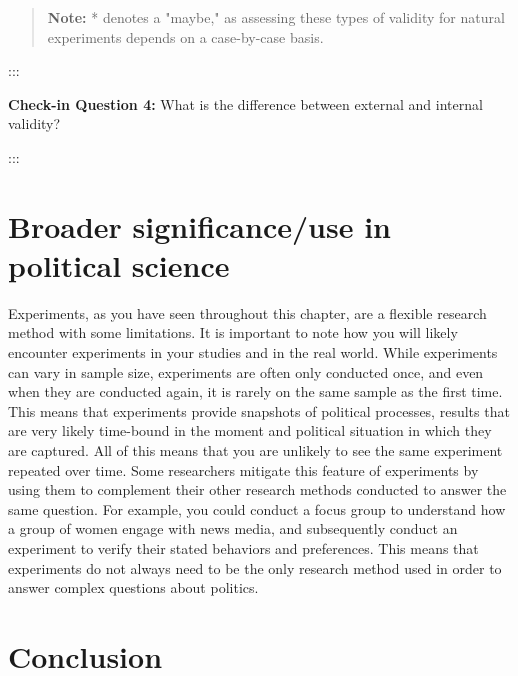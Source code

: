 \documentclass{book}
\begin{document}
\begin{quote}
\textbf{Note:} * denotes a "maybe," as assessing these types of validity for
natural experiments depends on a case-by-case basis.
\end{quote}

:::

\textbf{Check-in Question 4:} What is the difference between external and
internal validity?

:::

\hypertarget{broader-significanceuse-in-political-science-3}{%
\section{Broader significance/use in political
science}\label{broader-significanceuse-in-political-science-3}}

Experiments, as you have seen throughout this chapter, are a flexible research
method with some limitations. It is important to note how you will likely
encounter experiments in your studies and in the real world. While experiments
can vary in sample size, experiments are often only conducted once, and even
when they are conducted again, it is rarely on the same sample as the first
time. This means that experiments provide snapshots of political processes,
results that are very likely time-bound in the moment and political situation
in which they are captured. All of this means that you are unlikely to see the
same experiment repeated over time. Some researchers mitigate this feature of
experiments by using them to complement their other research methods conducted
to answer the same question. For example, you could conduct a focus group to
understand how a group of women engage with news media, and subsequently
conduct an experiment to verify their stated behaviors and preferences. This
means that experiments do not always need to be the only research method used
in order to answer complex questions about politics.

\hypertarget{conclusion-5}{%
\section{Conclusion}\label{conclusion-5}}
\end{document}
